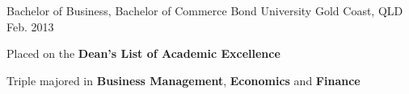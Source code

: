 \begin{cventries}
  \cventry
    {Bachelor of Business, Bachelor of Commerce}
    {Bond University}
    {Gold Coast, QLD}
    {Feb. 2013}
    {
      \begin{cvitems}
        \item {Placed on the \textbf{Dean's List of Academic Excellence}}
        \item {Triple majored in \textbf{Business Management}, \textbf{Economics} and \textbf{Finance}}
      \end{cvitems}
    }
\end{cventries}